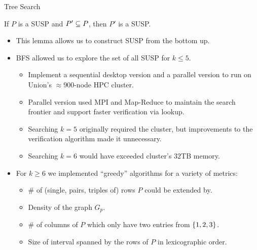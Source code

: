 \documentclass[t,10pt,
mathserif,xcolor=dvipsnames]{beamer}
\begin{document}
\begin{myframe}{Tree Search}

  \begin{lemma}
    If $P$ is a SUSP and $P' \subseteq P$, then $P'$ is a SUSP.
  \end{lemma}

  \begin{itemize}
  \item This lemma allows us to construct SUSP from the bottom up.

    \pause
    \medskip
  \item BFS allowed us to explore the set of all SUSP for $k
    \le 5$.
    \begin{itemize}
    \item Implement a sequential desktop version and a parallel
      version to run on Union's $\approx$900-node HPC cluster.
    \item Parallel version used MPI and Map-Reduce to maintain the
      search frontier and support faster verification via lookup.
    \item Searching $k = 5$ originally required the cluster, but
      improvements to the verification algorithm made it
      unnecessary.
    \item Searching $k = 6$ would have exceeded cluster's $32$TB memory.
    \end{itemize}

    \pause
    \medskip
  \item For $k \ge 6$ we implemented ``greedy'' algorithms for a variety of
    metrics:
    \begin{itemize}
    \item \# of (single, pairs, triples of) rows $P$ could be extended by.
    \item Density of the graph $G_p$.
    \item \# of columns of $P$ which only have two entries from
      $\{{1,2,3}\}$.
    \item Size of interval spanned by the rows of $P$ in lexicographic
      order.
    \end{itemize}
  \end{itemize}
  
\end{myframe}

\subsection{}
\end{document}
